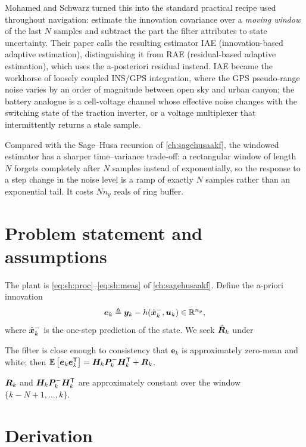 Mohamed and Schwarz \cite{mohamed1999adaptive} turned this into the standard practical recipe used
throughout navigation: estimate the innovation covariance over a \emph{moving window} of the last
$N$ samples and subtract the part the filter attributes to state uncertainty.  Their paper calls
the resulting estimator IAE (innovation-based adaptive estimation), distinguishing it from RAE
(residual-based adaptive estimation), which uses the a-posteriori residual instead.  IAE became the
workhorse of loosely coupled INS/GPS integration, where the GPS pseudo-range noise varies by an
order of magnitude between open sky and urban canyon; the battery analogue is a cell-voltage
channel whose effective noise changes with the switching state of the traction inverter, or a
voltage multiplexer that intermittently returns a stale sample.

Compared with the Sage--Husa recursion of \cref{ch:sagehusaakf}, the windowed estimator has a
sharper time--variance trade-off: a rectangular window of length $N$ forgets completely after $N$
samples instead of exponentially, so the response to a step change in the noise level is a ramp of
exactly $N$ samples rather than an exponential tail.  It costs $N n_y$ reals of ring buffer.

\section{Problem statement and assumptions}
The plant is \eqref{eq:sh:proc}--\eqref{eq:sh:meas} of \cref{ch:sagehusaakf}.  Define the
a-priori innovation
\begin{equation}
\bm{e}_k \triangleq \bm{y}_k - h(\hat{\bm{x}}^{-}_k,\bm{u}_k) \in \mathbb{R}^{n_y},
\label{eq:iae:innov}
\end{equation}
where $\hat{\bm{x}}^{-}_k$ is the one-step prediction of the state.  We seek $\hat{\bm{R}}_k$ under

\begin{assumption}\label{as:iae:white}
The filter is close enough to consistency that $\bm{e}_k$ is approximately zero-mean and white; then
$\mathbb{E}\left[\bm{e}_k\bm{e}_k^{\mathsf{T}}\right] = \bm{H}_k\bm{P}^{-}_k\bm{H}_k^{\mathsf{T}} + \bm{R}_k$.
\end{assumption}
\begin{assumption}\label{as:iae:stat}
$\bm{R}_k$ and $\bm{H}_k\bm{P}^{-}_k\bm{H}_k^{\mathsf{T}}$ are approximately constant over the window
$\{k-N+1,\dots,k\}$.
\end{assumption}

\section{Derivation}

